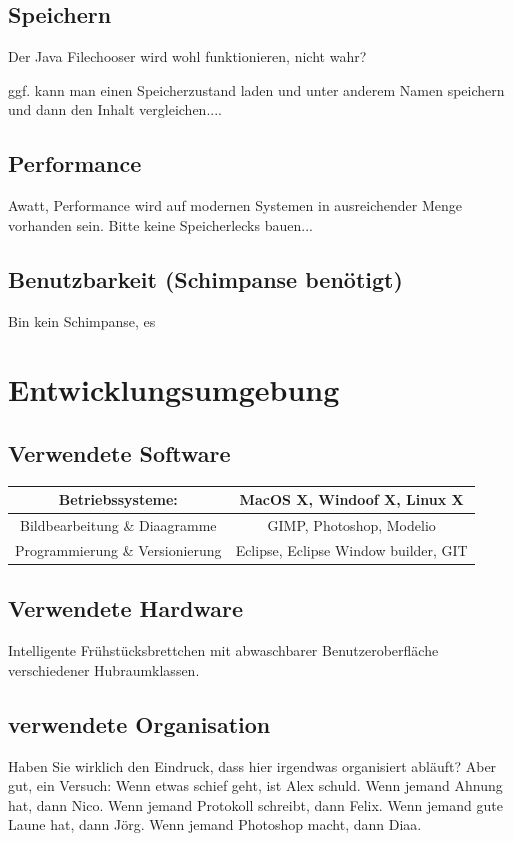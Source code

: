 \documentclass[11pt]{article}
\begin{document}
\subsection{Speichern}
Der Java Filechooser wird wohl funktionieren, nicht wahr?

ggf. kann man einen Speicherzustand laden und unter anderem Namen speichern und dann den Inhalt vergleichen....
\subsection{Performance}
Awatt, Performance wird auf modernen Systemen in ausreichender Menge vorhanden sein. Bitte keine Speicherlecks bauen...
\subsection {Benutzbarkeit (Schimpanse benötigt)}
Bin kein Schimpanse, es 
\pagebreak
\section{Entwicklungsumgebung}
\subsection{Verwendete Software}
\begin{tabular}{|c|c|}
\hline
Betriebssysteme:     &  MacOS X, Windoof X, Linux X
  \\
     \hline
     Bildbearbeitung  \&  Diaagramme & 
         GIMP, Photoshop, Modelio
 \\
     \hline
     Programmierung  \& Versionierung & 
          Eclipse, 
          Eclipse Window builder,
          GIT\\
     \hline
\end{tabular}
\subsection{Verwendete Hardware}
Intelligente Frühstücksbrettchen mit abwaschbarer Benutzeroberfläche verschiedener Hubraumklassen.
\subsection{verwendete Organisation}
Haben Sie wirklich den Eindruck, dass hier irgendwas organisiert abläuft? 
Aber gut, ein Versuch: 
Wenn etwas schief geht, ist Alex schuld.
Wenn jemand Ahnung hat, dann Nico.
Wenn jemand Protokoll schreibt, dann Felix.
Wenn jemand gute Laune hat, dann Jörg.
Wenn jemand Photoshop macht, dann Diaa.
\end{document}
